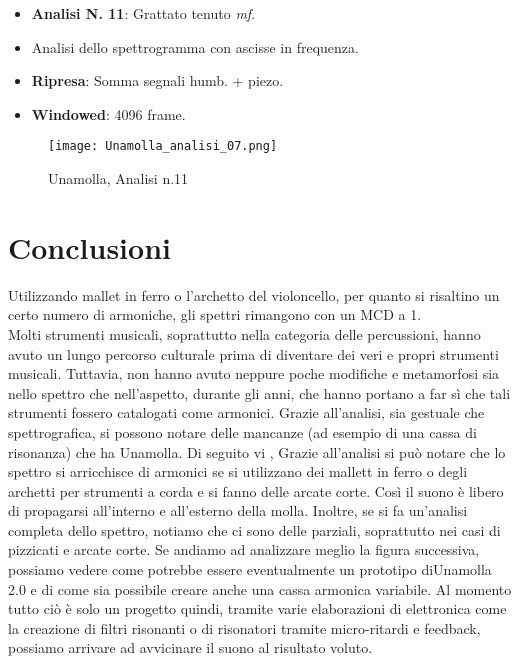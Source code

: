 \begin{itemize}
\item{\textbf{Analisi N. 11}: Grattato tenuto \textit{mf}.}
\item{Analisi dello spettrogramma con ascisse in frequenza.}
\item{\textbf{Ripresa}: Somma segnali humb. + piezo.}
\item{\textbf{Windowed}: 4096 frame.}
\end{itemize}

\begin{figure}

\begin{center}

\texttt{[image: Unamolla\_analisi\_07.png]}

\caption{Unamolla, Analisi n.11}

\label{fig:11_analisi_molla}

\end{center}

\end{figure}


\section*{Conclusioni}

Utilizzando mallet in ferro o l’archetto del violoncello, per quanto si risaltino un certo numero di armoniche, gli spettri rimangono con un MCD a 1. \\
Molti strumenti musicali, soprattutto nella categoria delle percussioni, hanno avuto un lungo percorso culturale prima di diventare dei veri e propri strumenti musicali. Tuttavia, non hanno avuto neppure poche modifiche e metamorfosi sia nello spettro che nell’aspetto, durante gli anni, che hanno portano a far sì che tali strumenti fossero catalogati come armonici. Grazie all’analisi, sia gestuale che spettrografica, si possono notare delle mancanze (ad esempio di una cassa di risonanza) che ha Unamolla. Di seguito vi , Grazie all’analisi si può notare che lo spettro si arricchisce di armonici se si utilizzano dei mallett in ferro o degli archetti per strumenti a corda e si fanno delle arcate corte. Così il suono è libero di propagarsi all’interno e all’esterno della molla. Inoltre, se si fa un’analisi completa dello spettro, notiamo che ci sono delle parziali, soprattutto nei casi di pizzicati e arcate corte. Se andiamo ad analizzare meglio la figura successiva, possiamo vedere come potrebbe essere eventualmente un prototipo diUnamolla 2.0 e di come sia possibile creare anche una cassa armonica variabile.
Al momento tutto ciò è solo un progetto quindi, tramite varie elaborazioni di elettronica come la creazione di filtri risonanti o di risonatori tramite micro-ritardi e feedback, possiamo arrivare ad avvicinare il suono al risultato voluto. 




